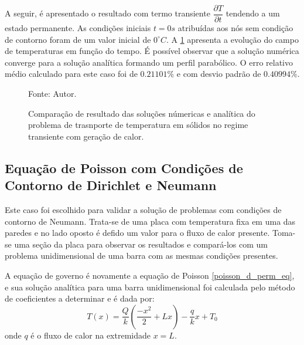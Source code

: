 A seguir, é apresentado o resultado com termo transiente $\dfrac{\partial T}{\partial t}$ tendendo a um estado permanente.
As condições iniciais $t=0s$ atribuídas aos nós sem condição de contorno foram de um valor inicial de $0^{\circ}C$.
A \ref{poisson_d_trans_comp} apresenta a evolução do campo de temperaturas em função do tempo.
É possível observar que a solução numérica converge para a solução analítica formando um perfil parabólico.
O erro relativo médio calculado para este caso foi de $0.21101\%$ e com desvio padrão de $0.40994\%$.
\begin{figure}[H]
    \centering
     {\raggedleft \scriptsize Fonte: Autor.}
    \caption{Comparação de resultado das soluções númericas e analítica do problema de trasnporte de temperatura em sólidos no regime transiente com geração de calor.}
    \label{poisson_d_trans_comp}
\end{figure}

\subsection{\textbf{Equação de Poisson com Condições de Contorno de Dirichlet e Neumann}}
\label{sec_poisson_neu}
Este caso foi escolhido para validar a solução de problemas com condições de contorno de Neumann.
Trata-se de uma placa com temperatura fixa em uma das paredes e no lado oposto é defido um valor para o fluxo de calor presente.
Toma-se uma seção da placa para observar os resultados e compará-los com um problema unidimensional de uma barra com as mesmas condições presentes.

A equação de governo é novamente a equação de Poisson \eqref{poisson_d_perm_eq}, e sua solução analítica para uma barra unidimensional foi calculada pelo método de coeficientes a determinar e é dada por:
\begin{equation}
    T(x) = \dfrac{Q}{k}\left(\dfrac{-x^2}{2} + L x\right) - \dfrac{q}{k} x + T_0
    \label{poisson_n_sol} 
\end{equation}
onde $q$ é o fluxo de calor na extremidade $x=L$.


